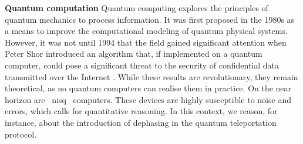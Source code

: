\textbf{Quantum computation}
Quantum computing explores the principles of quantum mechanics to process information. It was first proposed in the 1980s as a means to improve the computational modeling of quantum physical systems. However, it was not until 1994 that the field gained significant attention when Peter Shor introduced an algorithm that, if implemented on a quantum computer, could pose a significant threat to the security of confidential data transmitted over the Internet \cite{shor1994algorithms}.
While these results are revolutionary, they remain theoretical, as no quantum computers can realise them in practice.
 On the near horizon are  \acrfull{nisq}  computers. These devices are highly susceptible to noise and errors, which calls for quantitative reasoning. In this context, we reason, for instance, about the introduction of dephasing in the quantum teleportation protocol. 
     










